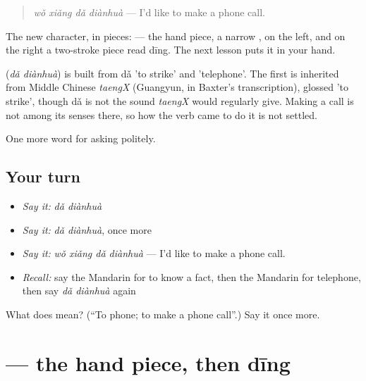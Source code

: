 \begin{quote}
\textbf{} \emph{wǒ xiǎng dǎ diànhuà} — I'd like to make a phone call.
\end{quote}

The new character, in pieces:  — the hand piece, a narrow , on the left, and on the right a two-stroke piece read dīng. The next lesson puts it in your hand.

\begin{cousinweb}
\textbf{} (\emph{dǎ diànhuà}) is built from dǎ 'to strike' and  'telephone'. The first is inherited from Middle Chinese \emph{taengX} (Guangyun, in Baxter's transcription), glossed 'to strike', though dǎ is not the sound \emph{taengX} would regularly give. Making a call is not among its senses there, so how the verb came to do it is not settled.
\end{cousinweb}

\begin{grammarlens}[title={What you've built}]
One more word for asking politely.
\end{grammarlens}

\subsection*{Your turn}
\begin{itemize}
\raggedright
  \item \emph{Say it:} \emph{dǎ diànhuà}
  \item \emph{Say it:} \emph{dǎ diànhuà}, once more
  \item \emph{Say it:} \emph{wǒ xiǎng dǎ diànhuà} — I'd like to make a phone call.
  \item \emph{Recall:} say the Mandarin for to know a fact, then the Mandarin for telephone, then say \emph{dǎ diànhuà} again
\end{itemize}

\begin{tcolorbox}[breakable,colback=teal!4,colframe=teal!35!black,title={Before you move on}]
What does  mean? (\textquotedblleft{}To phone; to make a phone call\textquotedblright{}.) Say it once more.
\end{tcolorbox}
\section[\texorpdfstring{\zh{打} (dǎ)}{打 (dǎ)}]{ — the hand piece, then dīng}

\label{lesson:ZH-W63-da-hit}



